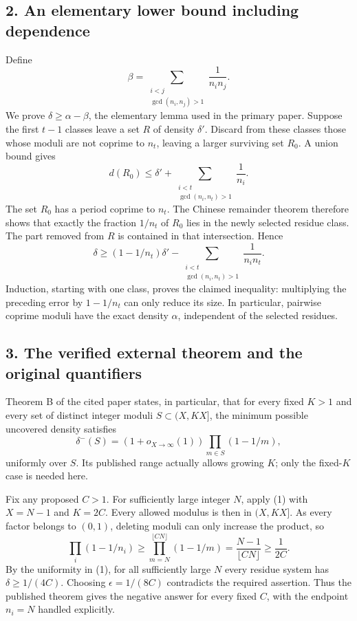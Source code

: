 \subsection{2. An elementary lower bound including dependence}
Define
\[
 \beta=\sum_{\substack{i<j\\\gcd(n_i,n_j)>1}}\frac1{n_i n_j}.
\]
We prove $\delta\geq\alpha-\beta$, the elementary lemma used in the
primary paper. Suppose the first $t-1$ classes leave a set $R$ of
density $\delta'$. Discard from these classes those whose moduli are
not coprime to $n_t$, leaving a larger surviving set $R_0$. A union
bound gives
\[
 d(R_0)\leq\delta'+
       \sum_{\substack{i<t\\\gcd(n_i,n_t)>1}}\frac1{n_i}.
\]
The set $R_0$ has a period coprime to $n_t$. The Chinese remainder
theorem therefore shows that exactly the fraction $1/n_t$ of $R_0$
lies in the newly selected residue class. The part removed from $R$
is contained in that intersection. Hence
\[
 \delta\geq(1-1/n_t)\delta'
       -\sum_{\substack{i<t\\\gcd(n_i,n_t)>1}}\frac1{n_i n_t}.
\]
Induction, starting with one class, proves the claimed inequality:
multiplying the preceding error by $1-1/n_t$ can only reduce its size.
In particular, pairwise coprime moduli have the exact density $\alpha$,
independent of the selected residues.

\subsection{3. The verified external theorem and the original quantifiers}
Theorem B of the cited paper states, in particular, that for every fixed
$K>1$ and every set of distinct integer moduli $S\subset(X,KX]$, the
minimum possible uncovered density satisfies
\[
 \delta^-(S)=(1+o_{X\to\infty}(1))
       \prod_{m\in S}(1-1/m),                         \tag{1}
\]
uniformly over $S$. Its published range actually allows growing $K$;
only the fixed-$K$ case is needed here.

Fix any proposed $C>1$. For sufficiently large integer $N$, apply (1)
with $X=N-1$ and $K=2C$. Every allowed modulus is then in $(X,KX]$.
As every factor belongs to $(0,1)$, deleting moduli can only increase
the product, so
\[
 \prod_i(1-1/n_i)
 \geq\prod_{m=N}^{\lfloor CN\rfloor}(1-1/m)
 =\frac{N-1}{\lfloor CN\rfloor}
 \geq\frac1{2C}.
\]
By the uniformity in (1), for all sufficiently large $N$ every residue
system has $\delta\geq1/(4C)$. Choosing $\epsilon=1/(8C)$ contradicts
the required assertion. Thus the published theorem gives the negative
answer for every fixed $C$, with the endpoint $n_i=N$ handled explicitly.

